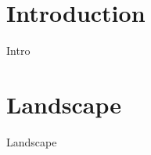 \documentclass[11pt, twoside]{article}
\def \compilebib {}
\begin{document}



\newpage


\tableofcontents
\listoffigures
\listoftables
\listoflistings


\newpage

\section{Introduction}
Intro

\landscapepage
\section{Landscape}
Landscape

\portraitpage

\ifdefined\compilebib

    \newpage
    \nocite{*}
    \printbibliography

\fi

\newpage

\begin{appendices}
\end{appendices}
\end{document}
